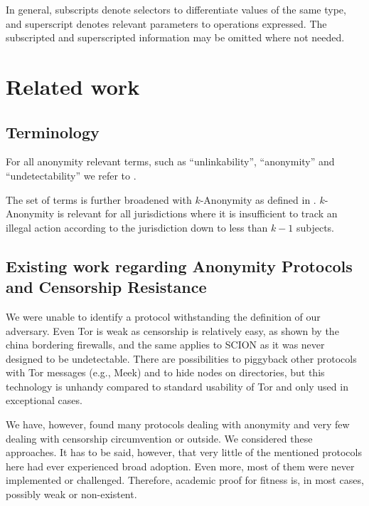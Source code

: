 \documentclass[acmsmall, screen, final, natbib=false]{acmart}
\begin{document}
	In general, subscripts denote selectors to differentiate values of the same type, and superscript denotes relevant parameters to operations expressed. The subscripted and superscripted information may be omitted where not needed.
	
	\section{Related work}
	\subsection{Terminology}
	For all anonymity relevant terms, such as ``unlinkability'', ``anonymity'' and ``undetectability'' we refer to \cite{anonTerminology}.
	
	The set of terms is further broadened with $k$-Anonymity as defined in \cite{k-anonymous:ccs2003}. $k$-Anonymity is relevant for all jurisdictions where it is insufficient to track an illegal action according to the jurisdiction down to less than $k-1$ subjects.
	
	\subsection{Existing work regarding Anonymity Protocols and Censorship Resistance}
	We were unable to identify a protocol withstanding the definition of our adversary. Even Tor is weak as censorship is relatively easy, as shown by the china bordering firewalls, and the same applies to SCION as it was never designed to be undetectable. There are possibilities to piggyback other protocols with Tor messages (e.g., Meek) and to hide nodes on directories, but this technology is unhandy compared to standard usability of Tor and only used in exceptional cases. 
	
	We have, however, found many protocols dealing with anonymity and very few dealing with censorship circumvention or outside. We considered these approaches. It has to be said, however, that very little of the mentioned protocols here had ever experienced broad adoption. Even more, most of them were never implemented or challenged. Therefore, academic proof for fitness is, in most cases, possibly weak or non-existent.
	
\end{document}
